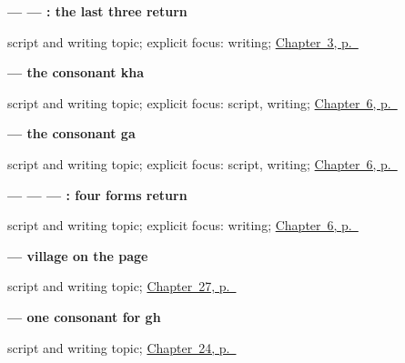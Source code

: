 \noindent\begin{minipage}[t]{\linewidth}
\raggedright
\textbf{ —  — : the last three return}\par
\footnotesize script and writing topic; explicit focus: writing; \hyperref[ch:gu-doorway-forms]{Chapter~3, p.~\pageref*{ch:gu-doorway-forms}}
\end{minipage}\par\smallskip

\noindent\begin{minipage}[t]{\linewidth}
\raggedright
\textbf{ — the consonant kha}\par
\footnotesize script and writing topic; explicit focus: script, writing; \hyperref[ch:gu-final-script-closure-a]{Chapter~6, p.~\pageref*{ch:gu-final-script-closure-a}}
\end{minipage}\par\smallskip

\noindent\begin{minipage}[t]{\linewidth}
\raggedright
\textbf{ — the consonant ga}\par
\footnotesize script and writing topic; explicit focus: script, writing; \hyperref[ch:gu-final-script-closure-a]{Chapter~6, p.~\pageref*{ch:gu-final-script-closure-a}}
\end{minipage}\par\smallskip

\noindent\begin{minipage}[t]{\linewidth}
\raggedright
\textbf{ —  —  — : four forms return}\par
\footnotesize script and writing topic; explicit focus: writing; \hyperref[ch:gu-final-script-closure-a]{Chapter~6, p.~\pageref*{ch:gu-final-script-closure-a}}
\end{minipage}\par\smallskip

\noindent\begin{minipage}[t]{\linewidth}
\raggedright
\textbf{ — village on the page}\par
\footnotesize script and writing topic; \hyperref[ch:gu-village-shop-ten]{Chapter~27, p.~\pageref*{ch:gu-village-shop-ten}}
\end{minipage}\par\smallskip

\noindent\begin{minipage}[t]{\linewidth}
\raggedright
\textbf{ — one consonant for gh}\par
\footnotesize script and writing topic; \hyperref[ch:gu-first-three-places]{Chapter~24, p.~\pageref*{ch:gu-first-three-places}}
\end{minipage}\par\smallskip

